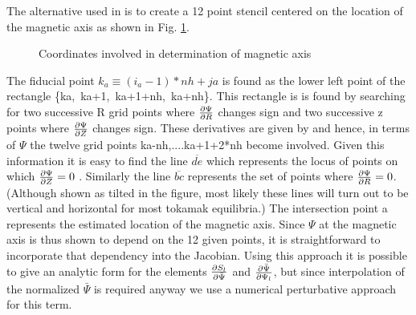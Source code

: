 The alternative used in \ot is to create a 12 point stencil centered
on the location of the magnetic axis as shown in Fig. \ref{eq:f1}.
\begin{figure}%
 \centering 
 \mbox{}
 \caption{Coordinates involved in determination of magnetic axis} 
 \label{eq:f1}
\end{figure}
The fiducial point $k_a \equiv (i_a-1)*nh +ja $ is found as the lower
left point of the rectangle \mbox{\{ka, ka+1, ka+1+nh, ka+nh\}}. This rectangle is
is found by searching for two successive R grid points where
$\frac{\partial{ \Psi}}{\partial{ R}} $ changes sign and two successive z points where
$\frac{\partial{ \Psi}}{\partial{ Z}} $ changes sign. These derivatives are given by  and hence, in terms of $\Psi$ the twelve grid points
{ka-nh,....ka+1+2*nh} become involved. Given this information  it is easy to find the line
$\overline{de}$  which represents the locus of points on which
$\frac{\partial{ \Psi}}{\partial{ Z}} =0 $ . Similarly the line $\overline{bc}$ represents the set of
points where $\frac{\partial{ \Psi}}{\partial{ R}} =0 $. (Although shown as tilted in the figure,
most likely these lines will turn out to be vertical and horizontal for most
tokamak equilibria.) The intersection point \textsf{a} represents the estimated
location of the magnetic axis. Since $\Psi $ at the magnetic axis is thus shown
to depend on the 12 given points, it is straightforward to incorporate that
dependency into the Jacobian. Using this approach it is possible to give an
analytic form for the elements $\frac{\partial{ S_l}}{\partial{ \bar{\Psi}}}$ and
$\frac{\partial{ \bar{\Psi}}}{\partial{ \Psi_l}}$, but since interpolation of the normalized
$\bar{\Psi}$ is required anyway we use a numerical perturbative approach for
this term.

